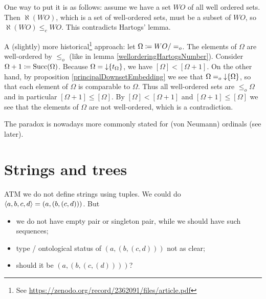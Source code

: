 One way to put it is as follows: assume we have a set $WO$ of all well ordered sets. Then $\aleph(WO)$, which is a set of well-ordered sets, must be a subset of $WO$, so $\aleph(WO) \leq_c WO$. This contradicts Hartogs' lemma.

A (slightly) more historical\footnote{See \url{https://zenodo.org/record/2362091/files/article.pdf}} approach: let $\Omega \coloneqq WO/=_o$.
The elements of $\Omega$ are well-ordered by $\leq_o$ (like in lemma \ref{wellorderingHartogsNumber}).
Consider $\Omega+1 \coloneqq \operatorname{Succ}(\Omega)$. Because $\Omega = \operatorname{\downarrow}\{t_\Omega\}$, we have $[\Omega] < [\Omega +1]$.
On the other hand, by proposition \ref{principalDownsetEmbedding} we see that $\Omega =_o \operatorname{\downarrow}\{\Omega\}$, so that each element of $\Omega$ is comparable to $\Omega$.
Thus all well-ordered sets are $\leq_o \Omega$ and in particular $[\Omega + 1] \leq [\Omega]$. By $[\Omega] < [\Omega +1]$ and $[\Omega + 1] \leq [\Omega]$ we see that the elements of $\Omega$ are not well-ordered, which is a contradiction.

The paradox is nowadays more commonly stated for (von Neumann) ordinals (see later).




\section{Strings and trees}
ATM we do not define strings using tuples. We could do $\left\langle a,b,c,d \right\rangle = (a, (b,(c,d)))$. But
\begin{itemize}
\item we do not have empty pair or singleton pair, while we should have such sequences;
\item type / ontological status of $(a, (b,(c,d)))$ not as clear;
\item should it be $(a, (b,(c,(d))))$?
\end{itemize}

